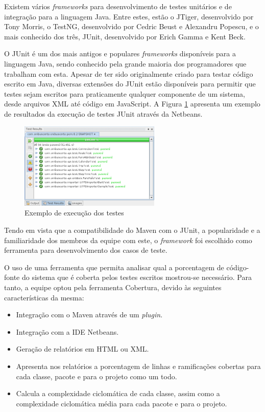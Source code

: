 Existem vários \emph{frameworks} para desenvolvimento de testes unitários e de integração para a linguagem Java.
Entre estes, estão o JTiger, desenvolvido por Tony Morris, o TestNG, desenvolvido por Cedric Beust e Alexandru Popescu, e o mais conhecido dos três, JUnit, desenvolvido por Erich Gamma e Kent Beck.

O JUnit é um dos mais antigos e populares \emph{frameworks} disponíveis para a linguagem Java, sendo conhecido pela grande maioria dos programadores que trabalham com esta.
Apesar de ter sido originalmente criado para testar código escrito em Java, diversas extensões do JUnit estão disponíveis para permitir que testes sejam escritos para praticamente qualquer componente de um sistema, desde arquivos XML até código em JavaScript.
A Figura \ref{fig:testes} apresenta um exemplo de resultados da execução de testes JUnit através da  Netbeans.
\begin{figure}[!htb]
	\centering
	\includegraphics[width=0.6\textwidth]{./testes.png}
	\caption[Exemplo de execução dos testes]{Exemplo de execução dos testes}
	\label{fig:testes}
\end{figure}

Tendo em vista que a compatibilidade do Maven com o JUnit, a popularidade e a familiaridade dos membros da equipe com este, o \emph{framework} foi escolhido como ferramenta para desenvolvimento dos casos de teste.

O uso de uma ferramenta que permita analisar qual a porcentagem de código-fonte do sistema que é coberta pelos testes escritos mostrou-se necessário.
Para tanto, a equipe optou pela ferramenta Cobertura, devido às seguintes características da mesma:

\begin{itemize}
	\item Integração com o Maven através de um \emph{plugin}.
	\item Integração com a IDE Netbeans.
	\item Geração de relatórios em HTML ou XML.
	\item Apresenta nos relatórios a porcentagem de linhas e ramificações cobertas para cada classe, pacote e para o projeto como um todo.
	\item Calcula a complexidade ciclomática de cada classe, assim como a complexidade ciclomática média para cada pacote e para o projeto.
\end{itemize}

